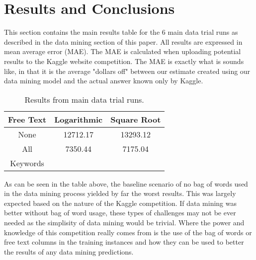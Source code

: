 \section{Results and Conclusions}

This section contains the main results table for the 6 main data trial runs as described in the data mining section
of this paper. All results are expressed in mean average error (MAE). The MAE is calculated when uploading potential
results to the Kaggle website competition. The MAE is exactly what is sounds like, in that it is the average
"dollars off" between our estimate created using our data mining model and the actual answer known only by Kaggle.\\

\begin{table}[h!]
\begin{center}
\begin{tabular}{c c c}
\hline
Free Text & Logarithmic & Square Root\\
\hline
\hline
None & 12712.17 & 13293.12\\
All & 7350.44 & 7175.04\\
Keywords & & \\
\hline
\end{tabular}
\end{center}
\caption{Results from main data trial runs.\label{tab:results}}
\end{table}

As can be seen in the table above, the baseline scenario of no bag of words used in the data mining process yielded
by far the worst results. This was largely expected based on the nature of the Kaggle competition. If data mining
was better without bag of word usage, these types of challenges may not be ever needed as the simplisity of data
mining would be trivial. Where the power and knowledge of this competition really comes from is the use of the
bag of words or free text columns in the training instances and how they can be used to better the results of any
data mining predictions.\\

